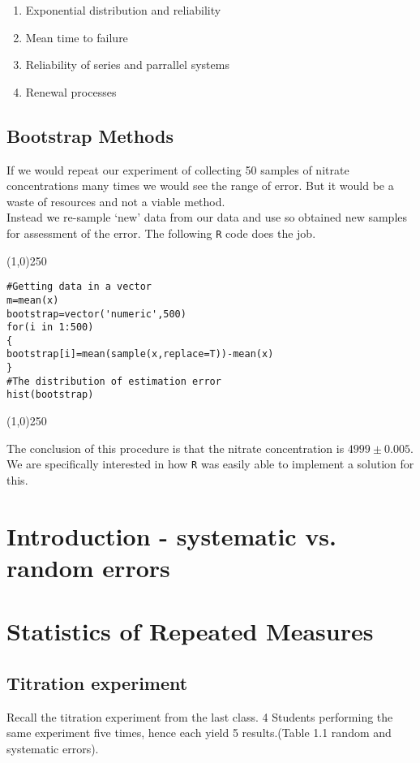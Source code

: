 \begin{enumerate}
	\item Exponential distribution and reliability\item Mean time to
	failure \item Reliability of series and parrallel systems \item
	Renewal processes\end{enumerate}
\newpage


\subsection{Bootstrap Methods}
If we would repeat our experiment of collecting 50 samples of nitrate concentrations many times we would see the range of error. But it would be a waste of resources and not a viable method.\\
Instead we re-sample `new' data from our data and use so obtained new samples for assessment of the error.
The following \texttt{R} code does the job.
\begin{center}
	\line(1,0){250}
\end{center}
\begin{verbatim}
#Getting data in a vector
m=mean(x)
bootstrap=vector('numeric',500)
for(i in 1:500)
{
bootstrap[i]=mean(sample(x,replace=T))-mean(x)
}
#The distribution of estimation error
hist(bootstrap)
\end{verbatim}
\begin{center}
	\line(1,0){250}
\end{center}
The conclusion of this procedure is that the nitrate concentration is $4999 \pm 0.005$. We are specifically interested in how \texttt{R} was easily able to implement a solution for this.
\newpage
\section{Introduction - systematic vs. random errors}




\section{Statistics of Repeated Measures}
\subsection{Titration experiment}

Recall the titration experiment from the last class. 4 Students performing the same experiment five times, hence each yield 5 results.(Table 1.1 random and systematic errors).


